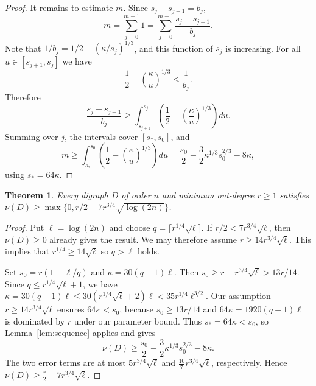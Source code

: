 \documentclass[a4paper,12pt]{article}
\newtheorem{theorem}{Theorem}[section]
\numberwithin{equation}{section}
\newcommand{\jbjcomment}[1]{\textcolor{blue}{JBJ: #1}}
\begin{document}
\begin{proof}
It remains to estimate $m$. Since $s_j-s_{j+1}=b_j$,
$$
m=\sum_{j=0}^{m-1}1=\sum_{j=0}^{m-1}\frac{s_j-s_{j+1}}{b_j}.
$$
Note that $1/b_j=1/2-(\kappa/s_j)^{1/3}$, and this function of $s_j$ is
increasing. %
For all $u\in [s_{j+1},s_j]$ we have 
$$
\frac12-\left(\frac{\kappa}{u}\right)^{1/3}\le\frac1{b_j}.
$$
Therefore
$$
\frac{s_j-s_{j+1}}{b_j}
\ge\int_{s_{j+1}}^{s_j}\left(\frac12-\left(\frac{\kappa}{u}\right)^{1/3}\right)du.
$$
Summing over $j$, the intervals cover $[s_\ast,s_0]$, and
$$
m\ge\int_{s_\ast}^{s_0}\left(\frac12-\left(\frac{\kappa}{u}\right)^{1/3}\right)du
=\frac{s_0}{2}-\frac32\kappa^{1/3}s_0^{2/3}-8\kappa,
$$
using $s_\ast=64\kappa$.
\end{proof}


\begin{theorem}\label{thm:local}
Every digraph $D$ of order $n$ and minimum out-degree $r\ge1$
satisfies
$\nu(D)\ge\max\{0,r/2-7r^{3/4}\sqrt{\log(2n)}\}$.
\end{theorem}

\begin{proof}
Put $\ell=\log(2n)$ and choose $q=\lceil r^{1/4}\sqrt\ell\rceil$.
If $r/2<7r^{3/4}\sqrt\ell$, then $\nu(D)\ge0$ already gives the result.
We may therefore assume $r\ge14r^{3/4}\sqrt\ell$. This implies that $r^{1/4}\geq 14\sqrt{\ell}$ so $q>\ell$ holds.


Set $s_0=r(1-\ell/q)$ and $\kappa=30(q+1)\ell$. Then
$s_0\ge r-r^{3/4}\sqrt\ell>13r/14$.
Since $q\le r^{1/4}\sqrt{\ell}+1$, we have
$\kappa=30(q+1)\ell \le 30(r^{1/4}\sqrt{\ell}+2)\ell<35r^{1/4}\ell^{3/2}$.
Our assumption $r\ge14r^{3/4}\sqrt{\ell}$ ensures $64\kappa<s_0$, because $s_0\ge 13r/14$ and $64\kappa=1920(q+1)\ell$ is dominated by $r$ under our parameter bound.
Thus $s_\ast=64\kappa<s_0$, so Lemma~\ref{lem:sequence} applies and
gives
$$
\nu(D)\ge\frac{s_0}{2}-\frac32\kappa^{1/3}s_0^{2/3}-8\kappa.
$$
The two error terms are at most   $5r^{3/4}\sqrt\ell$ and 
$\frac{10}{7}r^{3/4}\sqrt\ell$, 
respectively. Hence
$
\nu(D)\ge\frac r2-7r^{3/4}\sqrt\ell$.
\end{proof}




\end{document}

